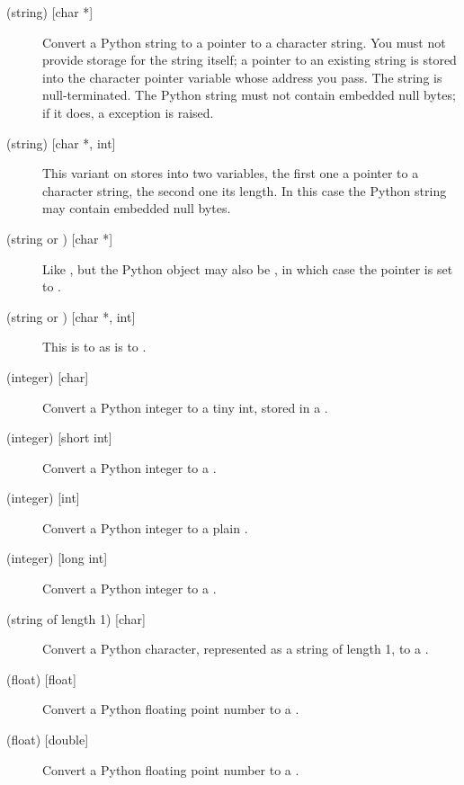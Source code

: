 \documentclass{manual}
\begin{document}
\begin{description}

\item[ (string) {[char *]}]
Convert a Python string to a \C{} pointer to a character string.  You
must not provide storage for the string itself; a pointer to an
existing string is stored into the character pointer variable whose
address you pass.  The \C{} string is null-terminated.  The Python string
must not contain embedded null bytes; if it does, a 
exception is raised.

\item[ (string) {[char *, int]}]
This variant on  stores into two \C{} variables, the first one
a pointer to a character string, the second one its length.  In this
case the Python string may contain embedded null bytes.

\item[ (string or ) {[char *]}]
Like , but the Python object may also be , in which
case the \C{} pointer is set to \NULL{}.

\item[ (string or ) {[char *, int]}]
This is to  as  is to .

\item[ (integer) {[char]}]
Convert a Python integer to a tiny int, stored in a \C{} .

\item[ (integer) {[short int]}]
Convert a Python integer to a \C{} .

\item[ (integer) {[int]}]
Convert a Python integer to a plain \C{} .

\item[ (integer) {[long int]}]
Convert a Python integer to a \C{} .

\item[ (string of length 1) {[char]}]
Convert a Python character, represented as a string of length 1, to a
\C{} .

\item[ (float) {[float]}]
Convert a Python floating point number to a \C{} .

\item[ (float) {[double]}]
Convert a Python floating point number to a \C{} .


\end{description}
\end{document}
